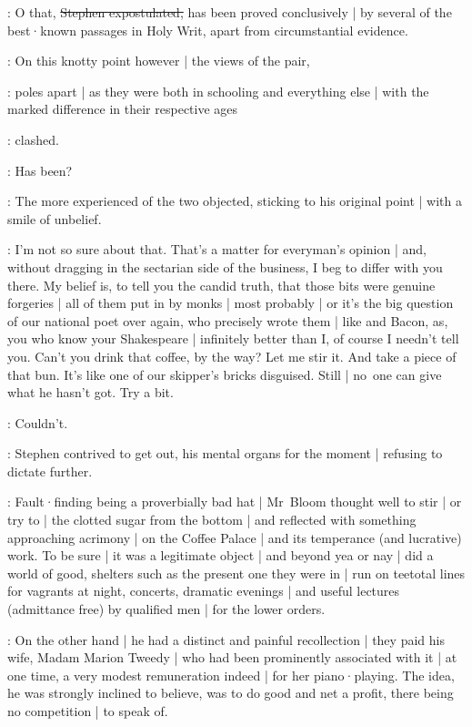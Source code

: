 \Stephen:
O that,
\sout{Stephen expostulated,}
has been proved conclusively |
by several of the best·known passages in Holy Writ,
apart from circumstantial evidence.

:
On this knotty point however |
the views of the pair,

:
poles apart |
as they were both in schooling and everything else |
with the marked difference in their respective ages

:
clashed.

\Bloom:
Has been?

:
The more experienced of the two objected,
sticking to his original point |
with a smile of unbelief.

\Bloom:
I'm not so sure about that.
That's a matter for everyman's opinion |
and,
without dragging in the sectarian side of the business,
I beg to differ with you  there.
My belief is,
to tell you the candid truth,
that those bits were genuine forgeries |
all of them put in by monks |
most probably |
or it's the big question of our national poet over again,
who precisely wrote them |
like  and Bacon,
as,
you who know your Shakespeare |
infinitely better than I,
of course I needn't tell you.
Can't you drink that coffee,
by the way?
Let me stir it.
And take a piece of that bun.
It's like one of our skipper's bricks disguised.
Still |
no~one can give what he hasn't got.
Try a bit.

\Stephen:
Couldn't.

:
Stephen contrived to get out,
his mental organs for the moment |
refusing to dictate further.

:
Fault·finding being a proverbially bad hat |
Mr~Bloom thought well to stir |
or try to |
the clotted sugar from the bottom |
and reflected with something approaching acrimony |
on the Coffee Palace |
and its temperance (and lucrative) work.
To be sure |
it was a legitimate object |
and beyond yea or nay |
did a world of good,
shelters such as the present one they were in |
run on teetotal lines for vagrants at night,
concerts,
dramatic evenings |
and useful lectures (admittance free) by qualified men |
for the lower orders.

:
On the other hand |
he had a distinct and painful recollection |
they paid his wife,
Madam Marion Tweedy |
who had been prominently associated with it |
at one time,
a very modest remuneration indeed |
for her piano·playing.
The idea,
he was strongly inclined to believe,
was to do good and net a profit,
there being no competition |
to speak of.

